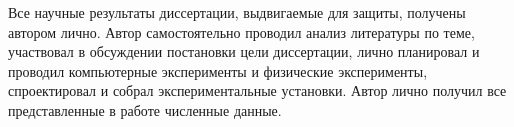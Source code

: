 {\contribution} Все научные результаты диссертации, выдвигаемые для защиты, получены автором лично. Автор самостоятельно проводил анализ литературы по теме, участвовал в обсуждении постановки цели диссертации, лично планировал и проводил компьютерные эксперименты и физические эксперименты, спроектировал и собрал экспериментальные установки. Автор лично получил все представленные в работе численные данные. 

{%
\begin{refsection}

    \nocite{*}


\end{refsection}}
